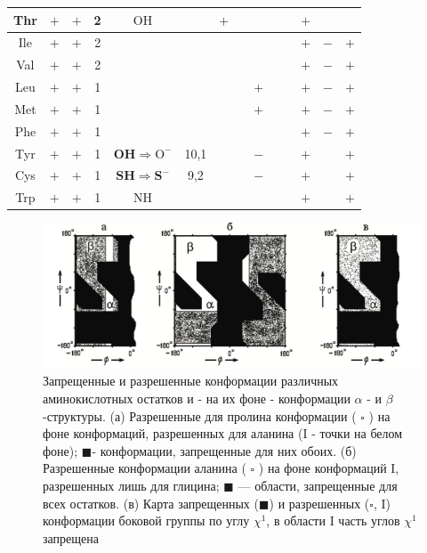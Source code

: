 \documentclass[
11pt,%
tightenlines,%
twoside,%
onecolumn,%
nofloats,%
nobibnotes,%
nofootinbib,%
superscriptaddress,%
noshowpacs,%
centertags]%
{revtex4}
\begin{document}
\begin{table}[!ht]
\begin{tabular}{|c|c|c|c|c|c|c|c|c|c|c|c|c|c|}
		\hline Thr & $+$ & $+$ & 2 & $\mathrm{OH}$ & & $+$ & & & & & \boldmath$+$ & & \\
		\hline Ile & $+$ & $+$ & 2 & & & & & & & & \boldmath$+$ & $-$ & \boldmath$+$ \\
		\hline Val & $+$ & $+$ & 2 & & & & & & & & \boldmath$+$ & $-$ & \boldmath$+$ \\
		\hline Leu & $+$ & $+$ & 1 & & & & & \boldmath$+$ & & & $+$ & \boldmath$-$ & \boldmath$+$ \\
		\hline Met & $+$ & $+$ & 1 & & & & & \boldmath$+$ & & & \boldmath$+$ & \boldmath$-$ & \boldmath$+$ \\
		\hline Phe & $+$ & $+$ & 1 & & & & & & & & $+$ & $-$ & \boldmath$+$ \\
		\hline Tyr &$+$ & $+$ & 1 & $\mathbf{O H} \Rightarrow \mathrm{O}^{-}$ & 10,1 & & &$-$ & & & $+$ & & $+$ \\
		\hline Cys & $+$ & $+$ & 1 & $\mathbf{S H} \Rightarrow \mathbf{S}^{-}$ & 9,2 & & & $-$ & & & $+$ & & \boldmath$+$ \\
		\hline Trp & $+$ & $+$ & 1 & $\mathrm{NH}$ & & & & & & & $+$ & & $+$ \\
		\hline
	\end{tabular}
\end{table}
\begin{figure}[!ht]
	\centering
	\includegraphics[width=\textwidth]{zone}
	\caption{Запрещенные и разрешенные конформации различных аминокислотных остатков и - на их фоне - конформации $\alpha$ - и $\beta$-структуры. (а) Разрешенные для пролина конформации ( $\square$ ) на фоне конформаций, разрешенных для аланина (I - точки на белом фоне); $\blacksquare$- конформации, запрещенные для них обоих. (б) Разрешенные конформации аланина ( $\square$ ) на фоне конформаций I, разрешенных лишь для глицина; $\blacksquare$ — области, запрещенные для всех остатков. (в) Карта запрещенных ($\blacksquare$) и разрешенных ($\square$, I) конформации боковой группы по углу $\chi^1$, в области I часть углов $\chi^1$ запрещена}
\end{figure}
\end{document}
